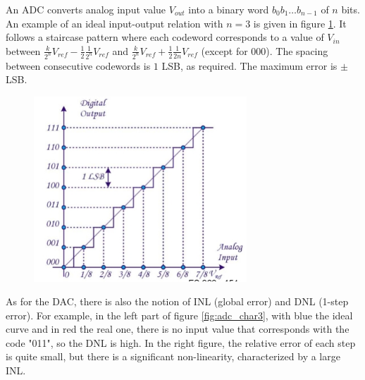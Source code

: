An ADC converts analog input value $V_{out}$ into a binary word $b_0 b_1 \ldots b_{n-1}$ of $n$ bits. An example of  an ideal input-output relation with $n=3$ is given in figure \ref{fig:adc_char1}. It follows a staircase pattern where each codeword corresponds to a value of $V_{in}$ between $\frac{k}{2^n} V_{ref} - \frac{1}{2} \frac{1}{2^n} V_{ref}$ and $\frac{k}{2^n} V_{ref} + \frac{1}{2} \frac{1}{2n} V_{ref}$ (except for $000$). The spacing between consecutive codewords is $1$ LSB, as required. The maximum error is $\pm$  LSB.\\
\begin{figure}[h!]
	\centering
	\includegraphics[width=8cm]{figures/ch18/adc_char1.jpg}
	\caption{}
	\label{fig:adc_char1}
\end{figure}
As for the DAC, there is also the notion of INL (global error) and DNL (1-step error). For example, in the left part of figure \ref{fig:adc_char3}, with blue the ideal curve and in red the real one, there is no input value that corresponds with the code "011", so the DNL is high. In the right figure, the relative error of each step is quite small, but there is a significant non-linearity, characterized by a large INL.

